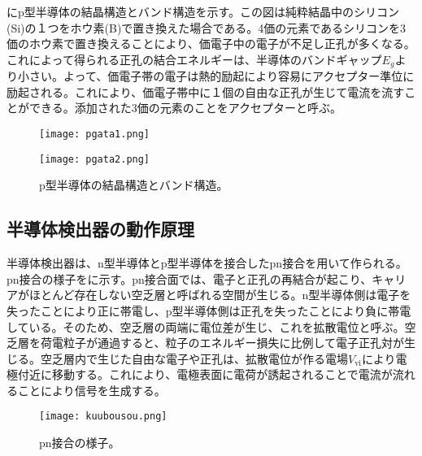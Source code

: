 にp型半導体の結晶構造とバンド構造を示す。この図は純粋結晶中のシリコン(Si)の１つをホウ素(B)で置き換えた場合である。4価の元素であるシリコンを3価のホウ素で置き換えることにより、価電子中の電子が不足し正孔が多くなる。これによって得られる正孔の結合エネルギーは、半導体のバンドギャップ$E_g$より小さい。よって、価電子帯の電子は熱的励起により容易にアクセプター準位に励起される。これにより、価電子帯中に１個の自由な正孔が生じて電流を流すことができる。添加された3価の元素のことをアクセプターと呼ぶ。
\begin{figure}[tbp]
  \begin{minipage}[b]{0.45\linewidth}
    \centering
    \texttt{[image: pgata1.png]}
  \end{minipage}
  \begin{minipage}[b]{0.45\linewidth}
    \centering
    \texttt{[image: pgata2.png]}
  \end{minipage}
  \caption[p型半導体の結晶構造とバンド構造]{p型半導体の結晶構造とバンド構造。}
  \label{fig:pgata}
\end{figure}


\subsection{半導体検出器の動作原理}
\label{sec:pnsetugou}

半導体検出器は、n型半導体とp型半導体を接合したpn接合を用いて作られる。pn接合の様子をに示す。pn接合面では、電子と正孔の再結合が起こり、キャリアがほとんど存在しない空乏層と呼ばれる空間が生じる。n型半導体側は電子を失ったことにより正に帯電し、p型半導体側は正孔を失ったことにより負に帯電している。そのため、空乏層の両端に電位差が生じ、これを拡散電位と呼ぶ。空乏層を荷電粒子が通過すると、粒子のエネルギー損失に比例して電子正孔対が生じる。空乏層内で生じた自由な電子や正孔は、拡散電位が作る電場$V_\mathrm{vi}$により電極付近に移動する。これにより、電極表面に電荷が誘起されることで電流が流れることにより信号を生成する。

\begin{figure}[tbp]
  \centering
  \texttt{[image: kuubousou.png]}
  \caption[pn接合の様子]{pn接合の様子。}
  \label{fig:kuubousou}
\end{figure}

